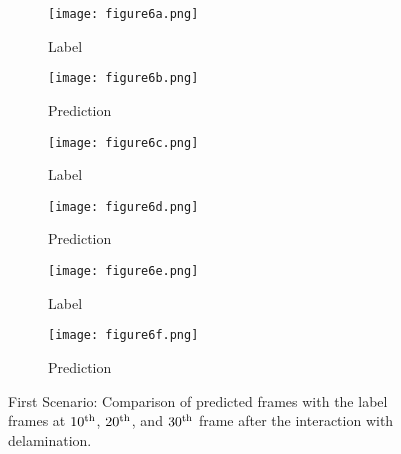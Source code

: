 \begin{figure} []
	\centering
	\begin{subfigure}[b]{0.44\textwidth}
		\centering
		\texttt{[image: figure6a.png]}
		\caption{Label}
		\label{fig:num_415_label1}
	\end{subfigure}
	\hfill
	\begin{subfigure}[b]{0.44\textwidth}
		\centering
		\texttt{[image: figure6b.png]} 
		\caption{Prediction}
		\label{fig:num_415_pred1}
	\end{subfigure}
	\hfill
	\begin{subfigure}[b]{0.44\textwidth}
		\centering
		\texttt{[image: figure6c.png]}
		\caption{Label}
		\label{fig:num_415_label2}
	\end{subfigure}
	\hfill
	\begin{subfigure}[b]{0.44\textwidth}
		\centering
		\texttt{[image: figure6d.png]}
		\caption{Prediction}
		\label{fig:num_415_pred2}
	\end{subfigure}
	\hfill
	\begin{subfigure}[b]{0.44\textwidth}
		\centering
		\texttt{[image: figure6e.png]}
		\caption{Label}
		\label{fig:num_415_label3}
	\end{subfigure}
	\hfill	
	\begin{subfigure}[b]{0.44\textwidth}
		\centering
		\texttt{[image: figure6f.png]}
		\caption{Prediction}
		\label{fig:num_415_pred3}
	\end{subfigure}
	\hfill	
	\caption{First Scenario: Comparison of predicted frames with the label 
		frames at $10\textsuperscript{th}$, $20\textsuperscript{th}$, and 
		$30\textsuperscript{th}$ frame after the interaction with delamination.}
	\label{fig:num_415}
\end{figure}
